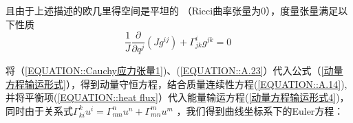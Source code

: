 \documentclass[LBMDerivation.tex]{subfiles}
\begin{document}
%
%

且由于上述描述的欧几里得空间是平坦的 （Ricci曲率张量为0），度量张量满足以下性质
\begin{equation}
  \frac{1}{J} \frac{\partial}{\partial q^{j}}\left(J g^{i j}\right)+\Gamma_{j k}^{i} g^{j k}=0
  \label{EQUATION::A.23} ~
\end{equation}
%
%


将（\ref{EQUATION::Cauchy应力张量1})、(\ref{EQUATION::A.23}）代入公式（\ref{动量方程输运形式}），得到动量守恒方程，结合质量连续性方程(\ref{EQUATION::A.14}), 并将平衡项(\ref{EQUATION::heat flux}）代入能量输运方程(\ref{动量方程输运形式4})，同时由于关系式$\Gamma_{ki}^k u^i = \Gamma_{mn}^n u^n + \Gamma_{mn}^m u^m$
，我们得到曲线坐标系下的Euler方程：



\end{document}
